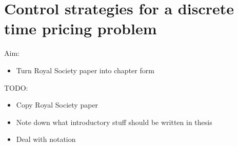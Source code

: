 \documentclass[main.tex]{subfiles}
\begin{document}
\chapter{Control strategies for a discrete time pricing
  problem}\label{ch:discrete_control}



Aim:
\begin{itemize}
\item Turn Royal Society paper into chapter form
\end{itemize}

TODO:
\begin{itemize}
\item Copy Royal Society paper
\item Note down what introductory stuff should be written in thesis
\item Deal with notation
\end{itemize}

\biblio{} %
\end{document}

